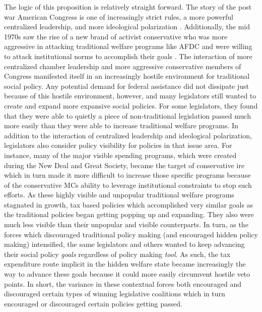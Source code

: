 \documentclass[12pt]{article}
\begin{document}
The logic of this proposition is relatively straight forward. The story of the post war American Congress is one of increasingly strict rules, a more powerful centralized leadership, and more ideological polarization \citep{rohde1991, binder2003}. Additionally, the mid 1970s saw the rise of a new brand of activist conservative who was more aggressive in attacking traditional welfare programs like AFDC and were willing to attack institutional norms to accomplish their goals \citep{hacker2007, theriault2013}. The interaction of more centralized chamber leadership and more aggressive conservative members of Congress manifested itself in an increasingly hostile environment for traditional social policy. Any potential demand for federal assistance did not dissipate just because of this hostile environment, however, and many legislators still wanted to create and expand more expansive social policies. For some legislators, they found that they were able to quietly a piece of non-traditional legislation passed much more easily than they were able to increase traditional welfare programs. In addition to the interaction of centralized leadership and ideological polarization, legislators also consider policy visibility for policies in that issue area. For instance, many of the major visible spending programs, which were created during the New Deal and Great Society, became the target of conservative ire which in turn made it more difficult to increase those specific programs because of the conservative MCs ability to leverage institutional constraints to stop such efforts. As these highly visible and unpopular traditional welfare programs stagnated in growth, tax based policies which accomplished very similar goals as the traditional policies began getting popping up and expanding. They also were much less visible than their unpopular and visible counterparts. In turn, as the forces which discouraged traditional policy making (and encouraged hidden policy making) intensified, the same legislators and others wanted to keep advancing their social policy \emph{goals} regardless of policy making \emph{tool}. As such, the tax expenditure route implicit in the hidden welfare state became increasingly the way to advance these goals because it could more easily circumvent hostile veto points. In short, the variance in these contextual forces both encouraged and discouraged certain types of winning legislative coalitions which in turn encouraged or discouraged certain policies getting passed.
\end{document}
